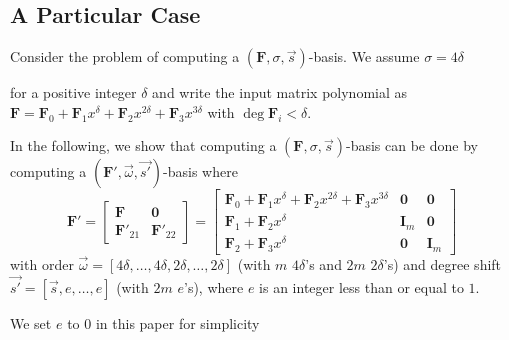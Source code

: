 \subsection{\label{sub:particularCase}A Particular Case}

Consider the problem of computing a $\left(\mathbf{F},\sigma,\vec{s}\right)$-basis.
We assume $\sigma=4\delta$ %
\begin{comment}
(The results below hold for any positive integer great than one, but
4 is used for simplicity. ) 
\end{comment}
for a positive integer $\delta$ and write the input matrix polynomial
as $\mathbf{F}=\mathbf{F}_{0}+\mathbf{F}_{1}x^{\delta}+\mathbf{F}_{2}x^{2\delta}+\mathbf{F}_{3}x^{3\delta}$
with $\deg\mathbf{F}_{i}<\delta$.%
\begin{comment}
again, changed from $\deg\mathbf{F}_{i}\le\delta-1$ to $\deg\mathbf{F}_{i}<\delta$
even though I prefer $\le$ 
\end{comment}
{} In the following, we show that computing a $\left(\mathbf{F},\sigma,\vec{s}\right)$-basis
can be done by computing a $(\mathbf{F}',\vec{\omega},\vec{s'})$-basis
where 
\begin{equation}
\mathbf{F}'=\left[\begin{array}{cc}
\mathbf{F} & \mathbf{0}\\
\mathbf{F}'_{21} & \mathbf{F}'_{22}
\end{array}\right]=\left[\begin{array}{c|cr}
\mathbf{F}_{0}+\mathbf{F}_{1}x^{\delta}+\mathbf{F}_{2}x^{2\delta}+\mathbf{F}_{3}x^{3\delta} & \mathbf{0} & \mathbf{0}\\
\hline \mathbf{F}_{1}+\mathbf{F}_{2}x^{\delta} & \mathbf{I}_{m} & \mathbf{0}\\
\mathbf{F}_{2}+\mathbf{F}_{3}x^{\delta} & \mathbf{0} & \mathbf{I}_{m}
\end{array}\right]\label{eq:extendedSTransformTop}
\end{equation}
 with order $\vec{\omega}=\left[4\delta,\dots,4\delta,2\delta,\dots,2\delta\right]$
(with $m$ $4\delta$'s and $2m$ $2\delta$'s) and degree shift $\vec{s'}=\left[\vec{s},e,\dots,e\right]$
(with $2m$ $e$'s), where $e$ is an integer less than or equal to
$1$. %
\begin{comment}
actually true for $e\le\min\vec{s}+1$. keeping this $e$ helps to
show that this hold true in more general situations, while Storjohann
only used $e=1$. it can be negative as well. 
\end{comment}
{} We set $e$ to $0$ in this paper for simplicity%
